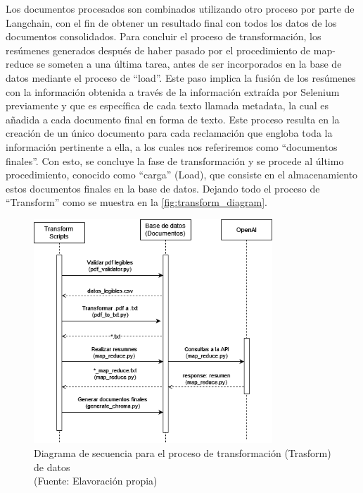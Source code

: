 \newpage

\par Los documentos procesados son combinados utilizando otro proceso por parte de Langchain, con el fin de obtener un resultado final con todos los datos de los documentos consolidados. 
Para concluir el proceso de transformación, los resúmenes generados después de haber pasado por el procedimiento de map-reduce 
se someten a una última tarea, antes de ser incorporados en la base de datos mediante el proceso de ``load''. Este paso implica la fusión de los resúmenes con la 
información obtenida a través de la información extraída por Selenium previamente y que es específica de cada texto llamada metadata, la cual es añadida a cada documento final en forma de texto. Este proceso 
resulta en la creación de un único documento para cada reclamación que engloba toda la información pertinente a ella, a los cuales nos referiremos como ``documentos finales''. 
Con esto, se concluye la fase de transformación y se procede al último procedimiento, conocido como ``carga'' (Load), que consiste 
en el almacenamiento estos documentos finales en la base de datos. Dejando todo el proceso de ``Transform'' como se muestra en la \autoref{fig:transform_diagram}. \\


\begin{figure}[ht!]
    \centering
    \includegraphics[width=0.8\textwidth]{figures/transfrom_diagram.png}
    \caption[Diagrama de secuencia para el proceso de transformación (Trasform) de datos]{Diagrama de secuencia para el proceso de transformación (Trasform) de datos\\
    {\scriptsize (Fuente: Elavoración propia)}}
    \label{fig:transform_diagram}
\end{figure}


